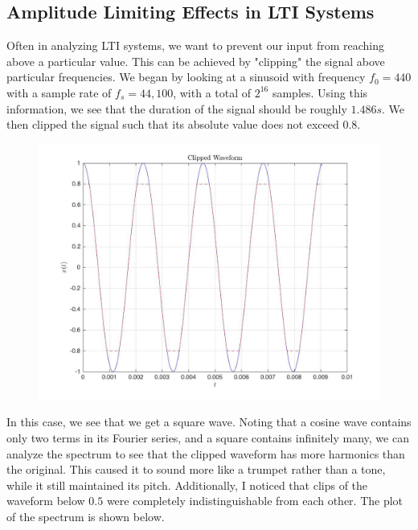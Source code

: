 \documentclass{article}
\begin{document}
\subsection{Amplitude Limiting Effects in LTI Systems}
Often in analyzing LTI systems, we want to prevent our input from reaching above a particular value. This can be achieved by "clipping" the signal above particular frequencies. We began by looking at a sinusoid with frequency $f_0 = 440$ with a sample rate of $f_s = 44,100$, with a total of $2^{16}$ samples. Using this information, we see that the duration of the signal should be roughly $1.486\si{s}$. We then clipped the signal such that its absolute value does not exceed $0.8$.
\begin{figure}[!htbp]
\begin{minipage}{\linewidth}
\includegraphics[width = 1\linewidth, height = 0.5\textheight]{clip1.jpg}
\end{minipage}
\end{figure}
\FloatBarrier
In this case, we see that we get a square wave. Noting that a cosine wave contains only two terms in its Fourier series, and a square contains infinitely many, we can analyze the spectrum to see that the clipped waveform has more harmonics than the original. This caused it to sound more like a trumpet rather than a tone, while it still maintained its pitch. Additionally, I noticed that clips of the waveform below $0.5$ were completely indistinguishable from each other. The plot of the spectrum is shown below. 
\end{document}
